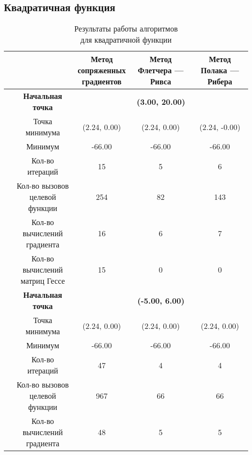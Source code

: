 \subsection{Квадратичная функция}

\begin{table}[H]
        \centering
        \vspace*{-1.5em}
        \caption{Результаты работы алгоритмов\\для квадратичной функции}
        \footnotesize
        \begin{tabular}{|c|c|c|c|c|}
        \hline
        & &\makecell{Метод\\сопряженных\\градиентов} &\makecell{Метод\\Флетчера --- Ривса} &\makecell{Метод\\Полака --- Рибера} \\
        \hline
	\multirow{12}{*}{\rotatebox[origin=c]{90}{$\varepsilon = 0.01$}}&\textbf{Начальная точка} &\multicolumn{3}{c|}{\textbf{(3.00, 20.00)}}\\
	\cline{2-5}
	&Точка минимума &(2.24, 0.00) &(2.24, 0.00) &(2.24, -0.00) \\ 
	\cline{2-5}
	&Минимум &-66.00 &-66.00 &-66.00 \\ 
	\cline{2-5}
	&Кол-во итераций &15 &5 &6 \\ 
	\cline{2-5}
	&\makecell{Кол-во вызовов\\целевой функции} &254 &82 &143 \\ 
	\cline{2-5}
	&\makecell{Кол-во вычислений\\градиента} &16 &6 &7 \\ 
	\cline{2-5}
	&\makecell{Кол-во вычислений\\матриц Гессе} &15 &0 &0 \\ 
	\cline{2-5}
\cline{2-5}&\textbf{Начальная точка} &\multicolumn{3}{c|}{\textbf{(-5.00, 6.00)}}\\
	\cline{2-5}
	&Точка минимума &(2.24, 0.00) &(2.24, 0.00) &(2.24, 0.00) \\ 
	\cline{2-5}
	&Минимум &-66.00 &-66.00 &-66.00 \\ 
	\cline{2-5}
	&Кол-во итераций &47 &4 &4 \\ 
	\cline{2-5}
	&\makecell{Кол-во вызовов\\целевой функции} &967 &66 &66 \\ 
	\cline{2-5}
	&\makecell{Кол-во вычислений\\градиента} &48 &5 &5 \\ 

\end{tabular}
\end{table}

